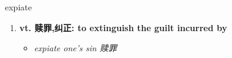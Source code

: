 
\begin{frame}
{\huge expiate}
\begin{center}
\begin{enumerate}\Large
  \item \textbf{vt. 赎罪,纠正: to extinguish the guilt incurred by}
  \begin{itemize}
    \item \em{\Large{expiate one’s sin 赎罪}}
  \end{itemize}
\end{enumerate}
\end{center}
\end{frame}
